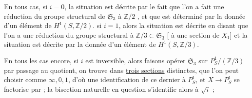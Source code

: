 
En tous cas, si $i=0$, la situation est décrite par le fait que l'on a fait une réduction du groupe structural de $\mathfrak S_3$ à $\mathbb Z/2$ , et que  est déterminé par la donnée d'un élément de $H^1(S,\mathbb Z/2)$.   si $i=1$, alors la situation est décrite en disant que l'on a une réduction du groupe structural à $\mathbb Z/3\subset\mathfrak S_3$ [ à une section de  $X_1$] et la situation est décrite par la donnée d'un élément de $H^1(S,\mathbb Z/3)$.


 En tous les cas encore, si $i$ est inversible, alors faisons opérer $\mathfrak S_3$ sur $P^1_S/(\mathbb Z/3)$ par passage au quotient, on trouve dans    \uline{trois sections} distinctes,  que l'on peut choisir comme $\infty,0,1$, d'où une identification de ce dernier à $P^1_S$, et $X\longrightarrow P^1_S$ se factorise par
; la bisection naturelle en question s'identifie alors à $\sqrt i$ ;
